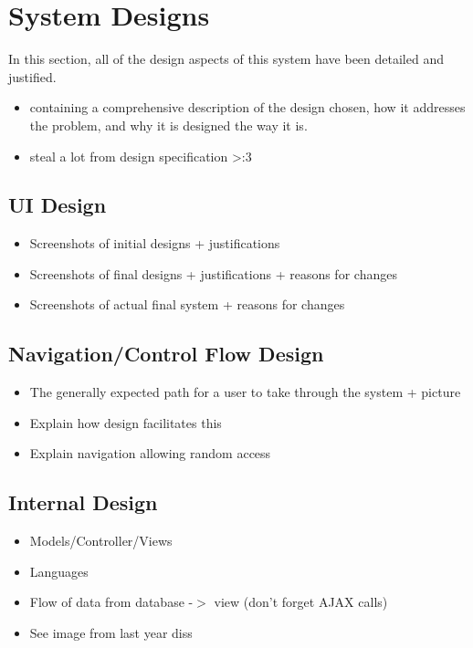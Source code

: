 \section{System Designs}
In this section, all of the design aspects of this system have been detailed and justified. 

{\color{red}
	\begin{itemize}
		\item containing a comprehensive description of the design chosen, how it addresses the problem, and why it is designed the way it is.
		\item steal a lot from design specification >:3
	\end{itemize}
}


\subsection{UI Design}
{\color{red}
	\begin{itemize}
		\item Screenshots of initial designs + justifications
		\item Screenshots of final designs + justifications + reasons for changes
		\item Screenshots of actual final system + reasons for changes
	\end{itemize}
}

\subsection{Navigation/Control Flow Design}	
\label{subsec:nav}	

{\color{red}
	\begin{itemize}
		\item The generally expected path for a user to take through the system + picture
		\item Explain how design facilitates this
		\item Explain navigation allowing random access		
	\end{itemize}
}

\subsection{Internal Design}
{\color{red}
	\begin{itemize}
		\item Models/Controller/Views
		\item Languages
		\item Flow of data from database -$>$ view (don't forget AJAX calls)
		\item See image from last year diss
	\end{itemize}
}
